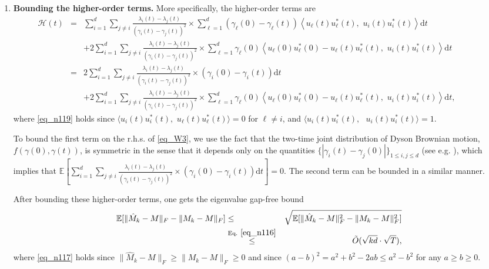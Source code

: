 \documentclass[11pt,letterpaper]{article}
\begin{document}
\begin{enumerate}
\color{black}

\item {\bf Bounding the higher-order terms.} 
%
More specifically, the higher-order terms are
%
 \begin{eqnarray}
\mathcal{H}(t) \!\!\! &=& \!\!\! \sum_{i=1}^{d} \sum_{j\neq i} \frac{\lambda_i(t) - \lambda_j(t)}{(\gamma_i(t) - \gamma_j(t))^2} \times \sum_{\ell=1}^d   (\gamma_\ell(0) - \gamma_\ell(t) ) \left \langle  u_{\ell}(t) u_{\ell}^\ast(t), \, \, u_i(t) u_i^\ast(t) \right \rangle \mathrm{d}t \nonumber\\
%
&& +  2\sum_{i=1}^{d} \sum_{j\neq i} \frac{\lambda_i(t) - \lambda_j(t)}{(\gamma_i(t) - \gamma_j(t))^2} \times \sum_{\ell=1}^d   \gamma_\ell(0) \left \langle u_{\ell}(0) u_{\ell}^\ast(0) -  u_{\ell}(t) u_{\ell}^\ast(t), \, \, u_i(t) u_i^\ast(t) \right \rangle \mathrm{d}t \label{eq_n119}\\
%
&= & 2\sum_{i=1}^{d} \sum_{j\neq i} \frac{\lambda_i(t) - \lambda_j(t)}{(\gamma_i(t) - \gamma_j(t))^2} \times  (\gamma_i (0) - \gamma_i(t) ) \mathrm{d}t \nonumber\\
%
& & +  2\sum_{i=1}^{d} \sum_{j\neq i} \frac{\lambda_i(t) - \lambda_j(t)}{(\gamma_i(t) - \gamma_j(t))^2} \times \sum_{\ell=1}^d   \gamma_\ell(0) \left \langle u_{\ell}(0) u_{\ell}^\ast(0) -  u_{\ell}(t) u_{\ell}^\ast(t), \, \, u_i(t) u_i^\ast(t) \right \rangle \mathrm{d}t, \qquad \quad \label{eq_W3}
\end{eqnarray}
%
where \eqref{eq_n119} holds since $ \langle  u_i(t) u_i^\ast(t), \, \, u_{\ell}(t) u_{\ell}^\ast(t)  \rangle = 0$ for $\ell \neq i$, and $ \langle  u_i(t) u_i^\ast(t),$ $\, \, u_i(t) u_i^\ast(t)  \rangle = 1$.



 To bound the first term on the r.h.s. of \eqref{eq_W3}, we use the fact that the two-time joint distribution of Dyson Brownian motion, $f(\gamma(0), \gamma(t))$, is symmetric in the sense that it depends only on the quantities $\{|\gamma_i(t) - \gamma_j(0)|\}_{1\leq i,j \leq d}$ (see e.g. \cite{tao2012topics}), which implies that $\mathbb{E}[\sum_{i=1}^{d} \sum_{j\neq i} \frac{\lambda_i(t) - \lambda_j(t)}{(\gamma_i(t) - \gamma_j(t))^2} \times  (\gamma_i (0) - \gamma_i(t) ) \mathrm{d}t]=0$.
%
The second term can be bounded in a similar manner.

After bounding these higher-order terms, one gets the eigenvalue gap-free bound 
%
 \begin{eqnarray}
 \mathbb{E}[\|\hat{M}_k - M\|_F - \|M_k - M\|_F] &\leq& \sqrt{\mathbb{E}[\|\hat{M}_k - M\|_F^2 - \|M_k - M\|_F^2]} \label{eq_n117}\\
 & \stackrel{\textrm{Eq. } \eqref{eq_n116}}{\leq} & \tilde{O}(\sqrt{kd} \cdot \sqrt{T}) \nonumber,
 \end{eqnarray}
 where \eqref{eq_n117} holds since $\|\hat{M}_k - M\|_F \geq \|M_k - M\|_F \geq 0$ and since $(a-b)^2 =a^2+b^2-2ab \leq a^2 - b^2$ for any $a\geq b \geq 0$.

\end{enumerate}
\end{document}

